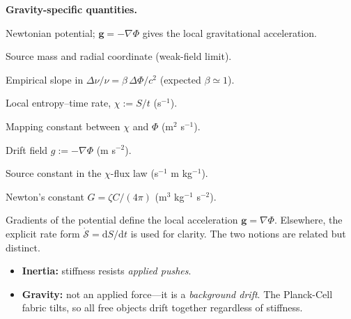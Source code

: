 \noindent\textbf{Gravity-specific quantities.}
\begin{description}[leftmargin=2.4em,labelsep=0.8em]
  \item[\(\Phi\)] Newtonian potential; \(\mathbf{g} = -\nabla\Phi\) gives the local gravitational acceleration.
  \item[\(M,\,r\)] Source mass and radial coordinate (weak-field limit).
  \item[\(\beta\)] Empirical slope in \(\Delta\nu/\nu = \beta\,\Delta\Phi / c^2\) (expected \(\beta \simeq 1\)).
  \item[\(\chi\)] Local entropy–time rate, \(\chi := S/t\) (s\(^{-1}\)).
  \item[\(\zeta\)] Mapping constant between \(\chi\) and \(\Phi\) (m\(^2\) s\(^{-1}\)).
  \item[\(g\)] Drift field \(g:=-\nabla\Phi\) (m s\(^{-2}\)).
  \item[\(C\)] Source constant in the \(\chi\)-flux law (s\(^{-1}\) m kg\(^{-1}\)).
  \item[\(G\)] Newton’s constant \(G = \zeta C / (4\pi)\) (m\(^3\) kg\(^{-1}\) s\(^{-2}\)).
\end{description}

\noindent Gradients of the potential define the local acceleration \(\mathbf{g} = \nabla\Phi\).  
Elsewhere, the explicit rate form \(\dot{\mathcal{S}} = \mathrm{d}S/\mathrm{d}t\) is used for clarity.  
The two notions are related but distinct.

\begin{tcolorbox}[colback=gray!5!white,colframe=black!15!black,title=\textbf{Key distinction}]
\begin{itemize}[leftmargin=1em]
  \item \textbf{Inertia:} stiffness resists \emph{applied pushes}.  
  \item \textbf{Gravity:} not an applied force—it is a \emph{background drift}.  
  The Planck-Cell fabric tilts, so all free objects drift together regardless of stiffness.
\end{itemize}
\end{tcolorbox}

